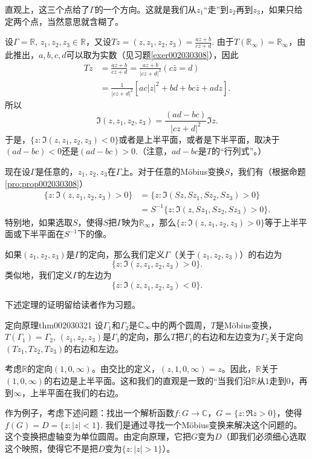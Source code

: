 直观上，这三个点给了$\Gamma$的一个方向。这就是我们从$z_1$“走”到$z_2$再到$z_3$，如果只给定两个点，当然意思就含糊了。

设$\Gamma = \mathbb{R}$, $z_1, z_2, z_3 \in \mathbb{R}$，又设$Tz = (z, z_1, z_2, z_3) = \frac{az+b}{cz+d}$. 由于$T(\mathbb{R}_{\infty}) = \mathbb{R}_{\infty}$，由此推出，$a,b,c,d$可以取为实数（见习题\ref{exer002030308}），因此
\[
\begin{aligned}
Tz &= \frac{az+b}{cz+d} = \frac{az+b}{|cz+d|^2}(c\bar{z} = d)\\
&=\frac{1}{|cz+d|^2}[ac|z|^2 + bd + bc\bar{z} + adz].
\end{aligned}
\]
所以
\[
\Im{(z, z_1, z_2, z_3)} = \frac{(ad-bc)}{|cz+d|^2}\Im{z}.
\]
于是，$\{z:\Im{(z, z_1, z_2, z_3)<0}\}$或者是上半平面，或者是下半平面，取决于$(ad-bc)<0$还是$(ad-bc)>0$.（注意，$ad-bc$是$T$的“行列式”。）

现在设$\Gamma$是任意的，$z_1, z_2, z_3$在$\Gamma$上。对于任意的M\"obius变换$S$，我们有（根据命题\ref{pro:prop002030308}）
\[
\begin{aligned}
\{z:\Im{(z, z_1, z_2, z_3)} > 0\} &= \{z:\Im{(Sz, Sz_1, Sz_2, Sz_3)} > 0\}\\
&= S^{-1}\{z:\Im{(z, Sz_1, Sz_2, Sz_3)} > 0\}.
\end{aligned}
\]
特别地，如果选取$S$，使得$S$把$\Gamma$映为$\mathbb{R}_{\infty}$，那么$\{z: \Im{(z, z_1,z_2, z_3)} > 0\}$等于上半平面或下半平面在$S^{-1}$下的像。

如果$(z_1, z_2, z_3)$是$\Gamma$的定向，那么我们定义$\Gamma$（关于$(z_1, z_2, z_3)$）的右边为
\[
\{z:\Im{(z,z_1, z_2, z_3)} > 0\}.
\]
类似地，我们定义$\Gamma$的左边为
\[
\{z:\Im{(z,z_1, z_2, z_3)} < 0\}.
\]

下述定理的证明留给读者作为习题。
\begin{theorem}{定向原理}{thm002030321}
设$\Gamma_1$和$\Gamma_2$是$\mathbb{C}_{\infty}$中的两个圆周，$T$是M\"obius变换，$T(\Gamma_1) = \Gamma_2$, $(z_1, z_2, z_3)$是$\Gamma_1$的定向，那么$T$把$\Gamma_1$的右边和左边变为$\Gamma_2$关于定向$(Tz_1, Tz_2, Tz_3)$的右边和左边。
\end{theorem}

考虑$\mathbb{R}$的定向$(1, 0, \infty)$。由交比的定义，$(z, 1, 0, \infty) = z$。因此，$\mathbb{R}$关于$(1,0,\infty)$的右边是上半平面。这和我们的直观是一致的“当我们沿$\mathbb{R}$从$1$走到$0$，再到$\infty$，上半平面在我们的右边。

作为例子，考虑下述问题：找出一个解析函数$f: G \to \mathbb{C}$，$G = \{z:\Re{z} > 0\}$，使得$f(G) = D = \{z:|z|<1\}$. 我们是通过寻找一个M\"obius变换来解决这个问题的。这个变换把虚轴变为单位圆周。由定向原理，它把$G$变为$D$（即我们必须细心选取这个映照，使得它不是把$D$变为$\{z:|z|>1\}$）。

